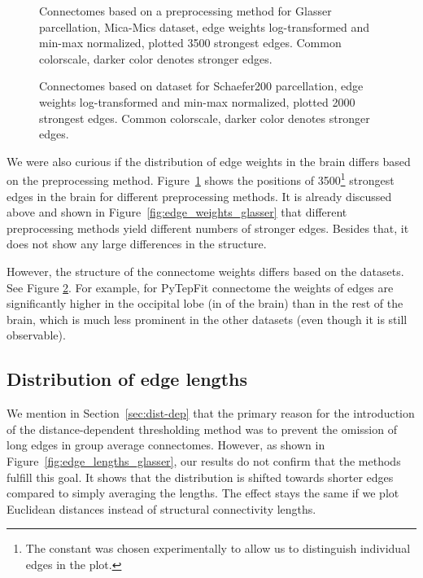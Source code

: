 \begin{figure}[p]
  \begin{center}
  \end{center}
  \caption[Connectomes based on preprocessing method]{Connectomes based on a preprocessing method for Glasser parcellation, Mica-Mics dataset, edge weights log-transformed and min-max normalized, plotted 3500 strongest edges. Common colorscale, darker color denotes stronger edges.}
  \label{fig:connectomes_mica}
\end{figure}

\begin{figure}[p]
  \begin{center}
  \end{center}
  \caption[Connectomes based on dataset]{Connectomes based on dataset for Schaefer200 parcellation, edge weights log-transformed and min-max normalized, plotted 2000 strongest edges. Common colorscale, darker color denotes stronger edges.}
  \label{fig:connectomes_by_dataset}
\end{figure}

We were also curious if the distribution of edge weights in the brain differs based on the preprocessing method. Figure~\ref{fig:connectomes_mica} shows the positions of 3500\footnote{The constant was chosen experimentally to allow us to distinguish individual edges in the plot.} strongest edges in the brain for different preprocessing methods. It is already discussed above and shown in Figure~\ref{fig:edge_weights_glasser} that different preprocessing methods yield different numbers of stronger edges. Besides that, it does not show any large differences in the structure.

However, the structure of the connectome weights differs based on the datasets. See Figure \ref{fig:connectomes_by_dataset}. For example, for PyTepFit connectome the weights of edges are significantly higher in the occipital lobe (in  of the brain) than in the rest of the brain, which is much less prominent in the other datasets (even though it is still observable).

\subsection{Distribution of edge lengths}

We mention in Section~\ref{sec:dist-dep} that the primary reason for the introduction of the distance-dependent thresholding method was to prevent the omission of long edges in group average connectomes. However, as shown in Figure~\ref{fig:edge_lengths_glasser}, our results do not confirm that the methods fulfill this goal. It shows that the distribution is shifted towards shorter edges compared to simply averaging the lengths. The effect stays the same if we plot Euclidean distances instead of structural connectivity lengths. 


